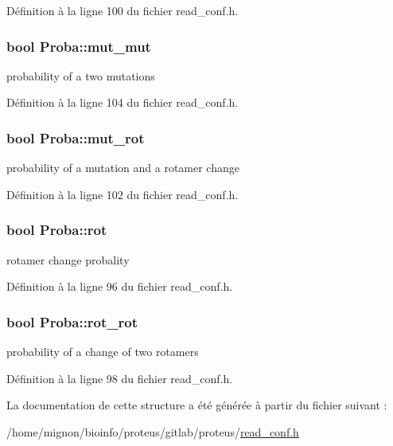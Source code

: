 Définition à la ligne 100 du fichier read\+\_\+conf.\+h.

\hypertarget{struct_proba_a754ae5112e69caa40b6f48703acc3133}{
\subsubsection[{mut\+\_\+mut}]{\setlength{\rightskip}{0pt plus 5cm}bool Proba\+::mut\+\_\+mut}}\label{struct_proba_a754ae5112e69caa40b6f48703acc3133}


probability of a two mutations 



Définition à la ligne 104 du fichier read\+\_\+conf.\+h.

\hypertarget{struct_proba_a9d6ba546e4120b335d1ce9eae107fbc0}{
\subsubsection[{mut\+\_\+rot}]{\setlength{\rightskip}{0pt plus 5cm}bool Proba\+::mut\+\_\+rot}}\label{struct_proba_a9d6ba546e4120b335d1ce9eae107fbc0}


probability of a mutation and a rotamer change 



Définition à la ligne 102 du fichier read\+\_\+conf.\+h.

\hypertarget{struct_proba_a4fa9409e1684d2f42524567d2305b0c4}{
\subsubsection[{rot}]{\setlength{\rightskip}{0pt plus 5cm}bool Proba\+::rot}}\label{struct_proba_a4fa9409e1684d2f42524567d2305b0c4}


rotamer change probality 



Définition à la ligne 96 du fichier read\+\_\+conf.\+h.

\hypertarget{struct_proba_a0d48353cb0e8d591d25b1ec243cb5a9f}{
\subsubsection[{rot\+\_\+rot}]{\setlength{\rightskip}{0pt plus 5cm}bool Proba\+::rot\+\_\+rot}}\label{struct_proba_a0d48353cb0e8d591d25b1ec243cb5a9f}


probability of a change of two rotamers 



Définition à la ligne 98 du fichier read\+\_\+conf.\+h.



La documentation de cette structure a été générée à partir du fichier suivant \+:\begin{DoxyCompactItemize}
\item 
/home/mignon/bioinfo/proteus/gitlab/proteus/\hyperlink{read__conf_8h}{read\+\_\+conf.\+h}\end{DoxyCompactItemize}
